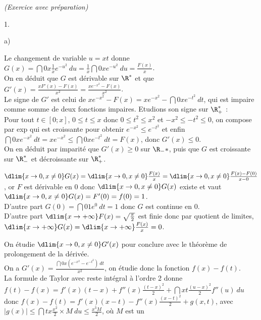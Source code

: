 \documentclass[11pt]{article}%
\begin{document}
\begin{exercice}{\it (Exercice avec préparation)}
\begin{noliste}{1.}
\begin{noliste}{a)}
\[\]
 \item Le changement de variable $u = xt$ donne $G(x) = \dint{0}{x}
\frac{1}{x} e^{ -u^{2}}\ du = \frac{1}{x} \dint{0}{x} e^{-u^{2}}\ du =
\frac{F(x)}{x}$. \\
 On en déduit que $G$ est dérivable sur $\R^*$ et que $G'(x) = \frac{x
F'(x) - F(x) }{x^{2}} = \frac{x e^{-x^{2}} - F(x)}{x^{2}}$. \\
 Le signe de $G'$ est celui de $x e^{-x^{2}} - F(x) = x e^{-x^{2}} -
\dint{0}{x} e^{-t^{2}}\ dt$, qui est impaire comme somme de deux
fonctions impaires. Etudions son signe sur $\R_+^*$ : \\
 Pour tout $t \in [0 ; x]$, $ 0 \leq t \leq x$ donc $0 \leq t^{2} \leq
x^{2}$ et $- x^{2} \leq -t^{2} \leq 0$, on compose par exp qui est
croissante pour obtenir $e^{-x^{2}} \leq e^{-t^{2}}$ et enfin
$\dint{0}{x} e^{-x^{2}}\ dt = x e^{-x^{2}} \leq \dint{0}{x} e^{-t^{2}}\
dt = F(x)$, donc $G'(x) \leq 0$. \\
 On en déduit par imparité que $G'(x) \geq 0$ sur $\R_-*$, puis que $G$
est croissante sur $\R_-^*$ et décroissante sur $\R_+^*$. \\
 \item $\dlim{x \rightarrow 0, x \neq 0} G(x) = \dlim{x \rightarrow 0,
x \neq 0} \frac{F(x)}{x} = \dlim{x \rightarrow 0, x \neq 0} \frac{ F(x)
- F(0)}{x-0}$, or $F$ est dérivable en 0 donc $\dlim{x \rightarrow 0, x
\neq 0} G(x)$ existe et vaut $\dlim{x \rightarrow 0, x \neq 0} G(x) =
F'(0) = f(0) = 1$. \\
 D'autre part $G(0) = \dint{0}{1} e^{0}\ dt = 1$ donc $G$ est continue
en 0. \\
 D'autre part $\dlim{x \rightarrow + \infty} F(x) = \sqrt{ \frac{ \pi
}{2} }$ est finie donc par quotient de limites, $\dlim{x \rightarrow +
\infty} G(x) = \dlim{x \rightarrow + \infty} \frac{F(x)}{x} = 0$. \\
 \item On étudie $\dlim{x \rightarrow 0, x \neq 0} G'(x)$ pour conclure
avec le théorème de prolongement de la dérivée. \\
 On a $G'(x) = \frac{ \dint{0}{x} ( e^{-x^{2}} - e^{-t^{2}} )\ dt
}{x^{2}}$, on étudie donc la fonction $f(x) - f(t)$. \\
 La formule de Taylor avec reste intégral à l'ordre 2 donne $f(t) -f(x)
= f'(x) (t-x) + f''(x) \frac{(t-x)^{2}}{2} + \dint{x}{t}
\frac{(u-x)^{2}}{2} f''(u)\ du$ donc $f(x) - f(t) = f'(x) (x-t) -
f''(x) \frac{(x-t)^{2}}{2} + g(x,t)$, avec $| g(x) | \leq \dint{t}{x}
\frac{x^{2}}{2} \times M\ du \leq \frac{x^{3} M}{2}$, où $M$ est un

\end{noliste}
\end{noliste}
\end{exercice}
\end{document}
